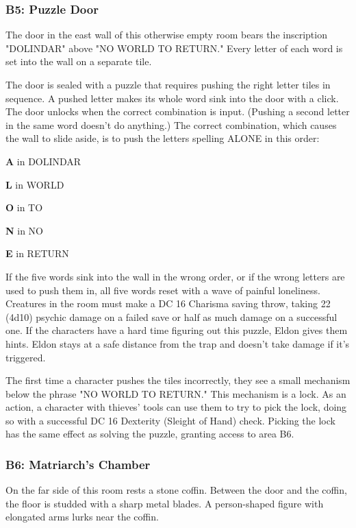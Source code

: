\documentclass[10pt,a4paper,twoside,bg=print,twocolumn,openany,nodeprecatedcode]{dndbook}
\begin{document}
\subsubsection{B5: Puzzle Door}
\begin{DndReadAloud}{}
The door in the east wall of this otherwise empty room bears the inscription "DOLINDAR" above "NO WORLD TO RETURN." Every letter of each word is set into the wall on a separate tile.

\end{DndReadAloud}

The door is sealed with a puzzle that requires pushing the right letter tiles in sequence. A pushed letter makes its whole word sink into the door with a click. The door unlocks when the correct combination is input. (Pushing a second letter in the same word doesn't do anything.) The correct combination, which causes the wall to slide aside, is to push the letters spelling ALONE in this order:

\textbf{A} in DOLINDAR

\textbf{L} in WORLD

\textbf{O} in TO

\textbf{N} in NO

\textbf{E} in RETURN

If the five words sink into the wall in the wrong order, or if the wrong letters are used to push them in, all five words reset with a wave of painful loneliness. Creatures in the room must make a DC 16 Charisma saving throw, taking 22 (4d10) psychic damage on a failed save or half as much damage on a successful one. If the characters have a hard time figuring out this puzzle, Eldon gives them hints. Eldon stays at a safe distance from the trap and doesn't take damage if it's triggered.

The first time a character pushes the tiles incorrectly, they see a small mechanism below the phrase "NO WORLD TO RETURN." This mechanism is a lock. As an action, a character with thieves' tools can use them to try to pick the lock, doing so with a successful DC 16 Dexterity (Sleight of Hand) check. Picking the lock has the same effect as solving the puzzle, granting access to area B6.

\subsubsection{B6: Matriarch's Chamber}
\begin{DndReadAloud}{}
On the far side of this room rests a stone coffin. Between the door and the coffin, the floor is studded with a sharp metal blades. A person-shaped figure with elongated arms lurks near the coffin.

\end{DndReadAloud}
\end{document}
